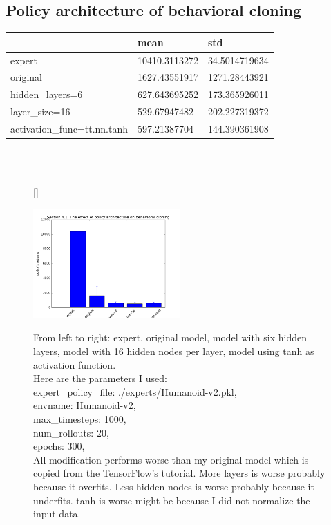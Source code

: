 \documentclass[12pt]{article}
\begin{document}
	\subsection{Policy architecture of behavioral cloning}
	\begin{tabu} to 1.0\textwidth {  |X[c] |X[c] |X[c] | }
		\hline
		& mean & std\\
		\hline
		expert  & 10410.3113272 & 34.5014719634\\
		\hline
		original  & 1627.43551917 & 1271.28443921\\
		\hline
		hidden\_layers=6  & 627.643695252 & 173.365926011\\
		\hline
		layer\_size=16  & 529.67947482 & 202.227319372\\
		\hline
		activation\_func=tt.nn.tanh  & 597.21387704 & 144.390361908\\
		\hline
	\end{tabu}\\ \\
	\begin{figure}[!htbp] 
		[\FBwidth]
		{\caption[caption]{
			From left to right: expert, original model, model with six hidden layers, model with 16 hidden nodes per layer, model using tanh as activation function.\\ \hspace{0.5\textwidth}
			Here are the parameters I used:\\ \hspace{0.5\textwidth}
			expert\_policy\_file: ./experts/Humanoid-v2.pkl,\\ \hspace{0.5\textwidth}
			envname: Humanoid-v2,\\ \hspace{0.5\textwidth}
			max\_timesteps: 1000,\\ \hspace{0.5\textwidth}
			num\_rollouts: 20,\\ \hspace{0.5\textwidth}
			epochs: 300,\\ \hspace{0.5\textwidth}
			All modification performs worse than my original model which is copied from the TensorFlow's tutorial.  More layers is worse probably because it overfits.  Less hidden nodes is worse probably because it underfits.  tanh is worse might be because I did not normalize the input data.
		}\label{fig:test}}
		{\includegraphics[width=0.5\textwidth]{section41.png}}
	\end{figure}
	
	
	
\end{document}
